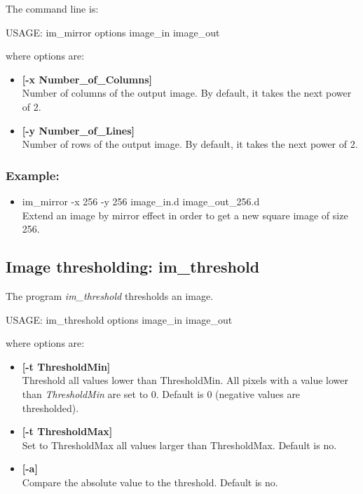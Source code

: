 The command line is:
{\bf
\begin{center}
USAGE: im\_mirror options image\_in image\_out
\end{center}}
where options are:
\begin{itemize}
\item {\bf[-x  Number\_of\_Columns]} \\
Number of columns of the output image. By default, it takes the next 
power of 2.
\item {\bf[-y  Number\_of\_Lines]} \\
Number of rows of the output image. By default, it takes the next 
power of 2.
\end{itemize}
\subsubsection*{Example:}
\begin{itemize}
\item im\_mirror -x 256 -y 256 image\_in.d image\_out\_256.d \\
Extend an image by mirror effect in order to get a new square image of
size 256.
\end{itemize}

\subsection{Image thresholding: im\_threshold}

The program {\em im\_threshold} thresholds an image. 
{\bf
\begin{center}
USAGE: im\_threshold options image\_in image\_out
\end{center}}
where options are:
\begin{itemize}
\item {\bf[-t ThresholdMin]} \\
Threshold all values lower than ThresholdMin. All pixels with a value
lower than  {\em ThresholdMin} are set to 0.
Default is 0 (negative values are thresholded).
\item {\bf[-t ThresholdMax]} \\
 Set to ThresholdMax  all values larger than ThresholdMax.
 Default is no.
\item {\bf[-a]} \\
Compare the absolute value to the threshold. Default is no.
\end{itemize}

